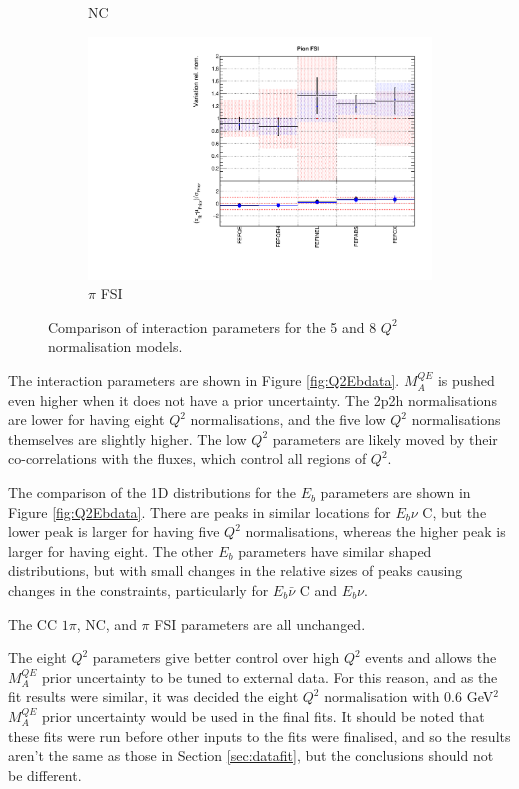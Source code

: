 \begin{figure}
\begin{subfigure}{0.49\textwidth}
  \caption{NC}
\end{subfigure}
\begin{subfigure}{0.49\textwidth}
  \centering
  \includegraphics[width=0.9\linewidth]{figs/comp5q2vs8q2xsec5}
  \caption{$\pi$ FSI}
\end{subfigure}
\caption{Comparison of interaction parameters for the 5 and 8 $Q^2$ normalisation models.}
\label{fig:comp5q2vs8q2xsec}
\end{figure}

The interaction parameters are shown in Figure \ref{fig:Q2Ebdata}. $M_{A}^{QE}$ is pushed even higher when it does not have a prior uncertainty. The 2p2h normalisations are lower for having eight $Q^2$ normalisations, and the five low $Q^2$ normalisations themselves are slightly higher. The low $Q^2$ parameters are likely moved by their co-correlations with the fluxes, which control all regions of $Q^2$.

The comparison of the 1D distributions for the $E_b$ parameters are shown in Figure \ref{fig:Q2Ebdata}. There are peaks in similar locations for $E_b \nu$ C, but the lower peak is larger for having five $Q^2$ normalisations, whereas the higher peak is larger for having eight. The other $E_b$ parameters have similar shaped distributions, but with small changes in the relative sizes of peaks causing changes in the constraints, particularly for $E_b \bar{\nu}$ C and $E_b \nu$.

The CC $1\pi$, NC, and $\pi$ FSI parameters are all unchanged.

The eight $Q^2$ parameters give better control over high $Q^2$ events and allows the $M_{A}^{QE}$ prior uncertainty to be tuned to external data. For this reason, and as the fit results were similar, it was decided the eight $Q^2$ normalisation with 0.6 GeV$^2$ $M_{A}^{QE}$ prior uncertainty would be used in the final fits. It should be noted that these fits were run before other inputs to the fits were finalised, and so the results aren't the same as those in Section \ref{sec:datafit}, but the conclusions should not be different.

